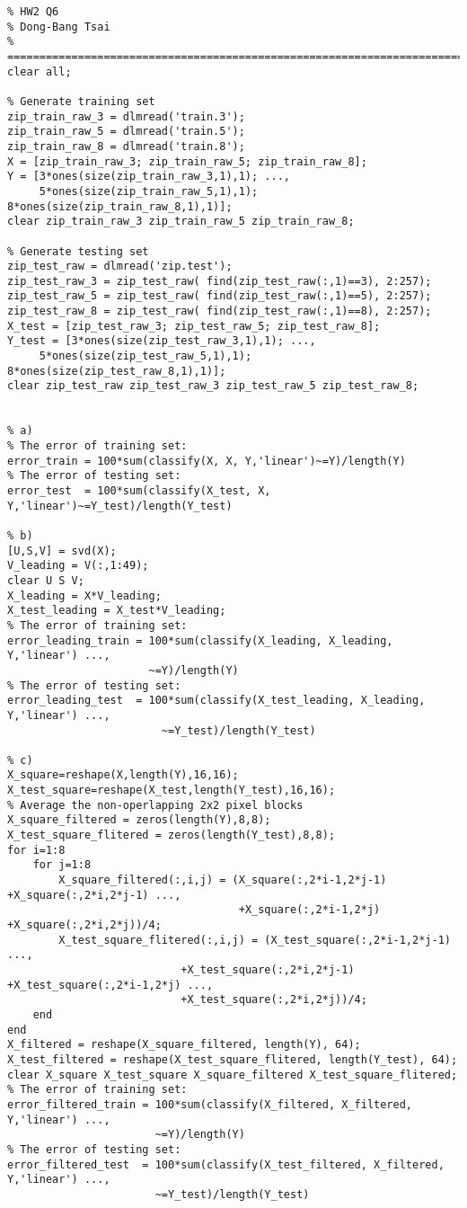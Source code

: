 \documentclass[pra,groupedaddress,amsmath,amssymb, column]{revtex4}
\begin{document}
\begin{verbatim}
% HW2 Q6
% Dong-Bang Tsai
% =========================================================================
clear all;

% Generate training set
zip_train_raw_3 = dlmread('train.3'); 
zip_train_raw_5 = dlmread('train.5'); 
zip_train_raw_8 = dlmread('train.8'); 
X = [zip_train_raw_3; zip_train_raw_5; zip_train_raw_8];
Y = [3*ones(size(zip_train_raw_3,1),1); ...,
     5*ones(size(zip_train_raw_5,1),1); 8*ones(size(zip_train_raw_8,1),1)];
clear zip_train_raw_3 zip_train_raw_5 zip_train_raw_8;

% Generate testing set
zip_test_raw = dlmread('zip.test'); 
zip_test_raw_3 = zip_test_raw( find(zip_test_raw(:,1)==3), 2:257);
zip_test_raw_5 = zip_test_raw( find(zip_test_raw(:,1)==5), 2:257);
zip_test_raw_8 = zip_test_raw( find(zip_test_raw(:,1)==8), 2:257);
X_test = [zip_test_raw_3; zip_test_raw_5; zip_test_raw_8];
Y_test = [3*ones(size(zip_test_raw_3,1),1); ...,
     5*ones(size(zip_test_raw_5,1),1); 8*ones(size(zip_test_raw_8,1),1)];
clear zip_test_raw zip_test_raw_3 zip_test_raw_5 zip_test_raw_8;


% a) 
% The error of training set:
error_train = 100*sum(classify(X, X, Y,'linear')~=Y)/length(Y)
% The error of testing set:
error_test  = 100*sum(classify(X_test, X, Y,'linear')~=Y_test)/length(Y_test)

% b)
[U,S,V] = svd(X);
V_leading = V(:,1:49);
clear U S V;
X_leading = X*V_leading;
X_test_leading = X_test*V_leading;
% The error of training set:
error_leading_train = 100*sum(classify(X_leading, X_leading, Y,'linear') ...,
                      ~=Y)/length(Y)
% The error of testing set:
error_leading_test  = 100*sum(classify(X_test_leading, X_leading, Y,'linear') ...,
                        ~=Y_test)/length(Y_test)

% c)
X_square=reshape(X,length(Y),16,16);
X_test_square=reshape(X_test,length(Y_test),16,16);
% Average the non-operlapping 2x2 pixel blocks
X_square_filtered = zeros(length(Y),8,8);
X_test_square_flitered = zeros(length(Y_test),8,8);
for i=1:8
    for j=1:8
        X_square_filtered(:,i,j) = (X_square(:,2*i-1,2*j-1) +X_square(:,2*i,2*j-1) ...,
                                    +X_square(:,2*i-1,2*j) +X_square(:,2*i,2*j))/4;
        X_test_square_flitered(:,i,j) = (X_test_square(:,2*i-1,2*j-1) ...,
                           +X_test_square(:,2*i,2*j-1) +X_test_square(:,2*i-1,2*j) ...,
                           +X_test_square(:,2*i,2*j))/4;
    end
end
X_filtered = reshape(X_square_filtered, length(Y), 64);
X_test_filtered = reshape(X_test_square_flitered, length(Y_test), 64);
clear X_square X_test_square X_square_filtered X_test_square_flitered;
% The error of training set:
error_filtered_train = 100*sum(classify(X_filtered, X_filtered, Y,'linear') ...,
                       ~=Y)/length(Y)
% The error of testing set:
error_filtered_test  = 100*sum(classify(X_test_filtered, X_filtered, Y,'linear') ...,
                       ~=Y_test)/length(Y_test)


\end{verbatim}
\end{document}
